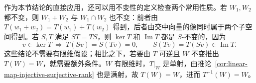 作为本节结论的直接应用，还可以用不变性的定义检查两个常用性质。若 $W_1,W_2$ 都不变，则 $W_1+W_2$ 与 $W_1\cap W_2$ 也不变：前者由 $T(w_1+w_2)=T(w_1)+T(w_2)$ 得到，后者由交中向量的像同时属于两个子空间得到。若 $S,T$ 满足 $ST=TS$，则 $\ker T$ 和 $\operatorname{Im}T$ 都是 $S$-不变的，因为
\[
    v\in\ker T\ \Longrightarrow\ T(Sv)=S(Tv)=0,
    \qquad S(Tv)=T(Sv)\in\operatorname{Im}T.
\]
这些结论不需要有限维假设；相比之下，若要由 $T$ 可逆且 $W$ 不变推出 $T(W)=W$，就需要额外条件。$W$ 有限维时，$T|_W$ 是单射，由推论~\ref{cor:linear-map-injective-surjective-rank} 也是满射，故 $T(W)=W$，进而 $T^{-1}(W)=W$。







